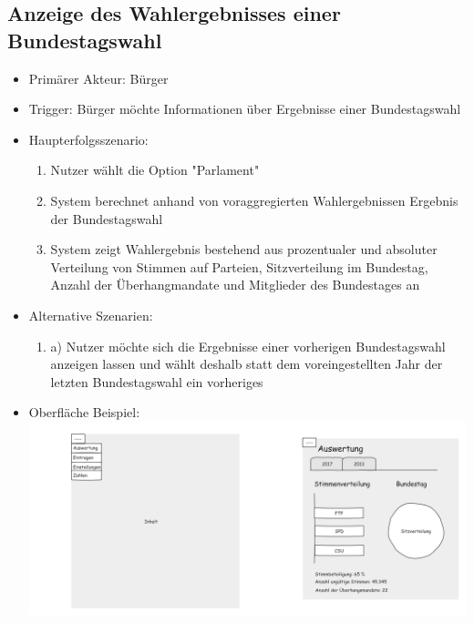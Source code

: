 \documentclass[a4paper]{scrreprt}
\begin{document}
\subsection{Anzeige des Wahlergebnisses einer Bundestagswahl}
\begin{itemize}
\item Primärer Akteur: Bürger
\item Trigger: Bürger möchte Informationen über Ergebnisse einer Bundestagswahl
\item Haupterfolgsszenario:
\begin{enumerate}
\item Nutzer wählt die Option "Parlament"
\item System berechnet anhand von voraggregierten Wahlergebnissen Ergebnis der Bundestagswahl
\item System zeigt Wahlergebnis bestehend aus prozentualer und absoluter Verteilung von Stimmen auf Parteien, Sitzverteilung im Bundestag, Anzahl der Überhangmandate und Mitglieder des Bundestages an
\end{enumerate}
\item Alternative Szenarien:
\begin{enumerate}
\item a) Nutzer möchte sich die Ergebnisse einer vorherigen Bundestagswahl anzeigen lassen und wählt deshalb statt dem voreingestellten Jahr der letzten Bundestagswahl ein vorheriges 
\end{enumerate}
\item Oberfläche Beispiel: \\
\includegraphics[width=.9\textwidth]{images/gesamt.png}
\end{itemize}
\end{document}
